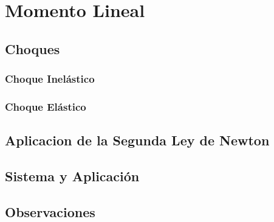 \chapter{Momento Lineal}

\section{Choques}
\subsection{Choque Inelástico}
\subsection{Choque Elástico}

\newpage
\section{Aplicacion de la Segunda Ley de Newton}

\newpage
\section{Sistema y Aplicación}

\newpage
\section{Observaciones}
